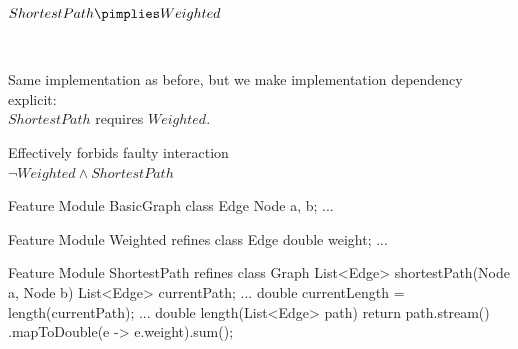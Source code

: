 \begin{frame}[fragile]{\myframetitle{}}
	\begin{fancycolumns}[animation=none]
		\centering
		
		\textcolor{lecturegreen}{$ShortestPath \pimplies Weighted$}
		
		~
		\begin{note}{}
			Same implementation as before, but we make implementation dependency explicit:\\
			$ShortestPath$ requires $Weighted$.
		\end{note}
		\begin{note}{}
			Effectively forbids faulty interaction\\
			$\neg Weighted \wedge ShortestPath$
		\end{note}
		\nextcolumn
\begin{codetight}{Feature Module BasicGraph}
	class Edge { Node a, b; ... }
\end{codetight}	
\begin{codetight}{Feature Module Weighted}
	refines class Edge { double weight; ... }
\end{codetight}	
\begin{codetight}{Feature Module ShortestPath}
	refines class Graph {
		List<Edge> shortestPath(Node a, Node b){
			List<Edge> currentPath;
			... 
			double currentLength = length(currentPath);
			... 
		}
		double length(List<Edge> path) {
			return path.stream()
			.mapToDouble(e -> e.weight).sum();
		}
	}
\end{codetight}	
	\end{fancycolumns}
\end{frame}


